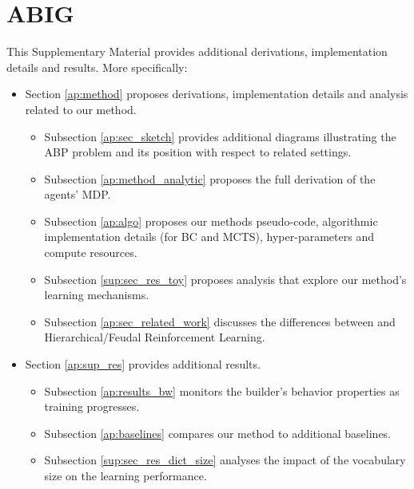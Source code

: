 
\chapter{ABIG}
This Supplementary Material provides additional derivations, implementation details and results. More specifically: 
\begin{itemize}[noitemsep]

    \item Section \ref{ap:method} proposes derivations, implementation details and analysis related to our method.
    \begin{itemize}[noitemsep]
        \item Subsection \ref{ap:sec_sketch} provides additional diagrams illustrating the ABP problem and its position with respect to related settings.
        \item Subsection \ref{ap:method_analytic} proposes the full derivation of the agents' MDP.
        \item Subsection \ref{ap:algo} proposes our methods pseudo-code, algorithmic implementation details (for BC and MCTS), hyper-parameters and compute resources.
        \item Subsection \ref{sup:sec_res_toy} proposes analysis that explore our method's learning mechanisms.
        \item Subsection \ref{ap:sec_related_work} discusses the differences between \abp and Hierarchical/Feudal Reinforcement Learning.
    \end{itemize}
    \item Section \ref{ap:sup_res} provides additional results.
    \begin{itemize}[noitemsep]
        \item Subsection \ref{ap:results_bw} monitors the builder's behavior properties as training progresses.
        \item Subsection \ref{ap:baselines} compares our method to additional baselines.
        \item Subsection \ref{sup:sec_res_dict_size} analyses the impact of the vocabulary size on the learning performance. 
    \end{itemize}
\end{itemize}


